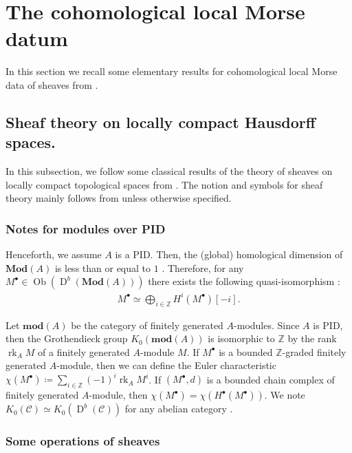 \documentclass[a4paper,dvipdfmx,reqno,12pt]{amsart}
\theoremstyle{definition}
\newcommand{\deq}{\coloneqq}
\newcommand{\Z}{\mathbb{Z}}%
\newcommand{\opn}[1]{\operatorname{#1}}
\newcommand{\catn}[1]{\mathbf{#1}}
\numberwithin{equation}{section}
\begin{document}
\section{The cohomological local Morse datum}
In this section we recall some elementary results
for cohomological local Morse data of sheaves from
\cite{MR2031639,MR1299726,MR4294126}.



\subsection{Sheaf theory on locally compact 
Hausdorff spaces.}
In this subsection, we follow some classical results of
the theory of sheaves on locally compact topological
spaces from \cite{iversenCohomologySheaves1986a,
MR1299726,MR1269324,MR2050072}.
The notion and symbols for 
sheaf theory mainly follows from \cite{MR1299726}
unless otherwise specified.

\subsubsection{Notes for modules over PID}

Henceforth, we assume $A$ is a PID. 
Then, the (global) homological dimension of 
$\catn{Mod}(A)$ is less than or equal to $1$
\cite[Exercise I.17, I.28]{MR1299726}.
Therefore, for any $M^{\bullet}\in \opn{Ob}(\opn{D}^{b}(\catn{Mod}(A)))$
there exists the following quasi-isomorphism 
\cite[Exercise I.18]{MR1299726}:
\begin{align}
M^{\bullet}\simeq 
\bigoplus_{i\in \Z}H^{i}(M^{\bullet})[-i].
\end{align}

Let $\catn{mod}(A)$ be the category of 
finitely generated $A$-modules.
Since $A$ is PID, then the Grothendieck group 
$K_0(\catn{mod}(A))$ is isomorphic to $\Z$ by
the rank $\opn{rk}_A M$ of a finitely generated
$A$-module $M$.
If $M^{\bullet}$ is a bounded $\Z$-graded finitely generated $A$-module,
then we can define the Euler characteristic 
$\chi(M^{\bullet})\deq 
\sum_{i\in \Z}(-1)^{i}\opn{rk}_A M^{i}$.
If $(M^{\bullet},d)$ is a bounded chain complex of finitely 
generated $A$-module, then 
$\chi(M^{\bullet})=\chi(H^{\bullet}(M^{\bullet}))$.
We note $K_0(\mathcal{C})\simeq 
K_0(\opn{D}^{b}(\mathcal{C}))$ for any abelian category 
\cite[Exercise I.27]{MR1299726}.

\subsubsection{Some operations of sheaves}
\end{document}
